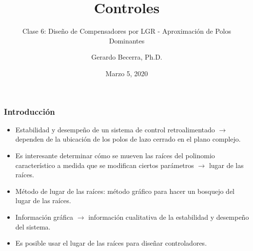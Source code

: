 \documentclass[aspectratio=169,handout]{beamer}
\title{Controles}
\subtitle{\small Clase 6: Diseño de Compensadores por LGR - Aproximación de Polos Dominantes}
\author{Gerardo Becerra, Ph.D.}
\institute{Pontificia Universidad Javeriana\\ Departamento de Electrónica}
\date{Marzo 5, 2020}
\theoremstyle{definition}
\theoremstyle{plain}
\theoremstyle{remark}
\begin{document}
\frame{\titlepage}	

\begin{frame}[<+->]\frametitle{Introducción}
\vspace*{5mm}
\centering
\begin{itemize}
	\item Estabilidad y desempeño de un sistema de control retroalimentado $\rightarrow$ dependen de la ubicación de los polos de lazo cerrado en el plano complejo.
	\item Es interesante determinar cómo se mueven las raíces del polinomio característico a medida que se modifican ciertos parámetros $\rightarrow$ lugar de las raíces.
	\item Método de lugar de las raíces: método gráfico para hacer un bosquejo del lugar de las raíces.
	\item Información gráfica $\rightarrow$ información cualitativa de la estabilidad y desempeño del sistema.
	\item Es posible usar el lugar de las raíces para diseñar controladores.
\end{itemize}
\end{frame}
\end{document}
